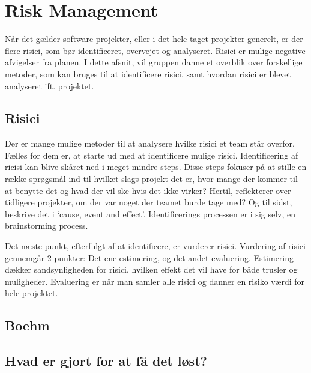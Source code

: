\chapter{Risk Management}\label{ch:Risk Management}

Når det gælder software projekter, eller i det hele taget projekter generelt, er der flere risici, som bør identificeret, overvejet og analyseret. Risici er mulige negative afvigelser fra planen.\cite{SlideRiskAnalysis} I dette afsnit, vil gruppen danne et overblik over forskellige metoder, som kan bruges til at identificere risici, samt hvordan risici er blevet analyseret ift. projektet.

\section{Risici}

Der er mange mulige metoder til at analysere hvilke risici et team står overfor. Fælles for dem er, at starte ud med at identificere mulige risici.
Identificering af ricisi kan blive skåret ned i meget mindre steps. \cite{SlideRiskAnalysis} Disse steps fokuser på at stille en række sprøgsmål ind til hvilket slags projekt det er, hvor mange der kommer til at benytte det og hvad der vil ske hvis det ikke virker? Hertil, reflekterer over tidligere projekter, om der var noget der teamet burde tage med? Og til sidst, beskrive det i ‘cause, event and effect’. Identificerings processen er i sig selv, en brainstorming process.

Det næste punkt, efterfulgt af at identificere, er vurderer risici. Vurdering af risici gennemgår 2 punkter: Det ene estimering, og det andet evaluering. Estimering dækker sandsynligheden for risici, hvilken effekt det vil have for både trusler og muligheder. Evaluering er når man samler alle risici og danner en risiko værdi for hele projektet.



\section{Boehm}


\section{Hvad er gjort for at få det løst?}
